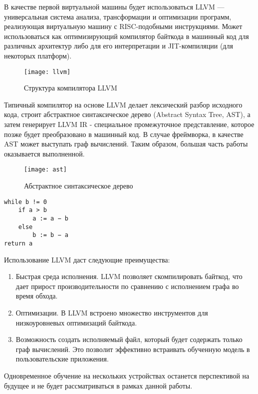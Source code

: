 В качестве первой виртуальной машины будет использоваться LLVM — универсальная система анализа, трансформации и оптимизации программ, реализующая виртуальную машину с RISC-подобными инструкциями. Может использоваться как оптимизирующий компилятор байткода в машинный код для различных архитектур либо для его интерпретации и JIT-компиляции (для некоторых платформ).
\begin{figure}[h]
	\centering
	\texttt{[image: llvm]}
	\caption{Структура компилятора LLVM}
	\label{task:llvm}
\end{figure}
\par
Типичный компилятор на основе LLVM делает лексический разбор исходного кода, строит абстрактное синтаксическое дерево (Abstract Syntax Tree, AST), а затем генерирует LLVM IR - специальное промежуточное представление, которое позже будет преобразовано в машинный код. В случае фреймворка, в качестве AST может выступать граф вычислений. Таким образом, большая часть работы оказывается выполненной.
\begin{figure}[h]
	\centering
	\texttt{[image: ast]}
	\caption{Абстрактное синтаксическое дерево}
	\label{task:ast}
\end{figure}
\begin{lstlisting}[caption=Псевдокод]
while b != 0
    if a > b
        a := a − b
    else
        b := b − a
return a
\end{lstlisting}
\par
Использование LLVM даст следующие преимущества:
\begin{enumerate}
	\item Быстрая среда исполнения. LLVM позволяет скомпилировать байткод, что дает прирост производительности по сравнению с исполнением графа во время обхода.
	\item Оптимизации. В LLVM встроено множество инструментов для низкоуровневых оптимизаций байткода.
	\item Возможность создать исполняемый файл, который будет содержать только граф вычислений. Это позволит эффективно встраивать обученную модель в пользовательские приложения.
\end{enumerate}
\par
	Одновременное обучение на нескольких устройствах останется перспективой на будущее и не будет рассматриваться в рамках данной работы.
